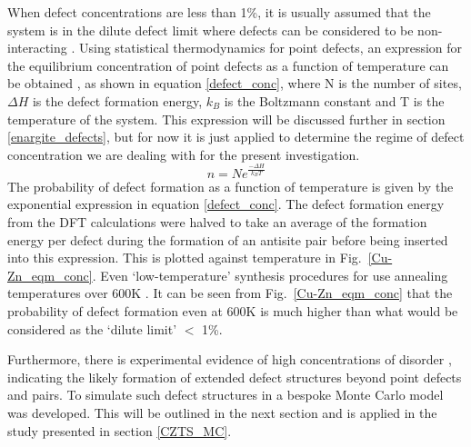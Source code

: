\documentclass[11pt, twoside]{report}
\begin{document}
When defect concentrations are less than 1\%, it is usually assumed that the system is in the dilute defect limit where defects can be considered to be non-interacting \cite{Stoneham_defect_lim}. Using statistical thermodynamics for point defects, an expression for the equilibrium concentration of point defects as a function of temperature can be obtained \cite{thermodynamics}, as shown in equation \ref{defect_conc}, where N is the number of sites, $\Delta H$ is the defect formation energy, $k_B$ is the Boltzmann constant and T is the temperature of the system. This expression will be discussed further in section \ref{enargite_defects}, but for now it is just applied to determine the regime of defect concentration we are dealing with for the present investigation.
\begin{equation} \label{defect_conc}
n = Ne^{\frac{-\Delta H}{k_BT}}
\end{equation}
The probability of defect formation as a function of temperature is given by the exponential expression in equation \ref{defect_conc}. The defect formation energy from the DFT calculations were halved to take an average of the formation energy per defect during the formation of an antisite pair before being inserted into this expression. This is plotted against temperature in Fig.~\ref{Cu-Zn_eqm_conc}. 
Even `low-temperature' synthesis procedures for {\CZTS} use annealing temperatures over 600K \cite{low_T_CZTS}. It can be seen from Fig.~\ref{Cu-Zn_eqm_conc} that the probability of defect formation even at 600K is much higher than what would be considered as the `dilute limit' $<$ 1\%.

Furthermore, there is experimental evidence of high concentrations of disorder \cite{Scragg, pot_fluc_4, neutron, Schorr}, indicating the likely formation of extended defect structures beyond point defects and pairs. To simulate such defect structures in {\CZTS} a bespoke Monte Carlo model was developed. This will be outlined in the next section and is applied in the study presented in section \ref{CZTS_MC}.
\end{document}
